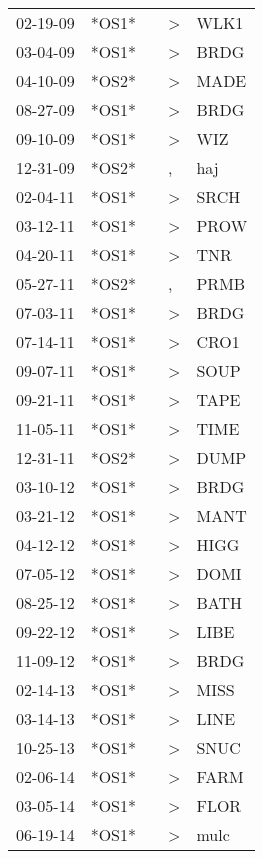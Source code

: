 \begin{supertabular}{lllll}
 02-19-09 &  *OS1* &   &  \textgreater &  WLK1 \\
 03-04-09 &  *OS1* &   &  \textgreater &  BRDG \\
 04-10-09 &  *OS2* &   &  \textgreater &  MADE \\
 08-27-09 &  *OS1* &   &  \textgreater &  BRDG \\
 09-10-09 &  *OS1* &   &  \textgreater &   WIZ \\
 12-31-09 &  *OS2* &   &             , &   haj \\
 02-04-11 &  *OS1* &   &  \textgreater &  SRCH \\
 03-12-11 &  *OS1* &   &  \textgreater &  PROW \\
 04-20-11 &  *OS1* &   &  \textgreater &   TNR \\
 05-27-11 &  *OS2* &   &             , &  PRMB \\
 07-03-11 &  *OS1* &   &  \textgreater &  BRDG \\
 07-14-11 &  *OS1* &   &  \textgreater &  CRO1 \\
 09-07-11 &  *OS1* &   &  \textgreater &  SOUP \\
 09-21-11 &  *OS1* &   &  \textgreater &  TAPE \\
 11-05-11 &  *OS1* &   &  \textgreater &  TIME \\
 12-31-11 &  *OS2* &   &  \textgreater &  DUMP \\
 03-10-12 &  *OS1* &   &  \textgreater &  BRDG \\
 03-21-12 &  *OS1* &   &  \textgreater &  MANT \\
 04-12-12 &  *OS1* &   &  \textgreater &  HIGG \\
 07-05-12 &  *OS1* &   &  \textgreater &  DOMI \\
 08-25-12 &  *OS1* &   &  \textgreater &  BATH \\
 09-22-12 &  *OS1* &   &  \textgreater &  LIBE \\
 11-09-12 &  *OS1* &   &  \textgreater &  BRDG \\
 02-14-13 &  *OS1* &   &  \textgreater &  MISS \\
 03-14-13 &  *OS1* &   &  \textgreater &  LINE \\
 10-25-13 &  *OS1* &   &  \textgreater &  SNUC \\
 02-06-14 &  *OS1* &   &  \textgreater &  FARM \\
 03-05-14 &  *OS1* &   &  \textgreater &  FLOR \\
 06-19-14 &  *OS1* &   &  \textgreater &  mulc \\

\end{supertabular}
